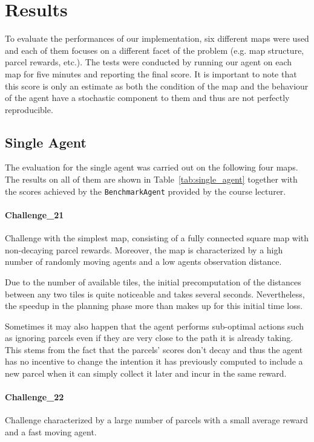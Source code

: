 \section{Results}
To evaluate the performances of our implementation, six different maps were used and each of them focuses on a different facet of the problem (e.g. map structure, parcel rewards, etc.). The tests were conducted by running our agent on each map for five minutes and reporting the final score. It is important to note that this score is only an estimate as both the condition of the map and the behaviour of the agent have a stochastic component to them and thus are not perfectly reproducible.

\subsection{Single Agent}
The evaluation for the single agent was carried out on the following four maps. The results on all of them are shown in Table~\ref{tab:single_agent} together with the scores achieved by the \texttt{BenchmarkAgent} provided by the course lecturer.

\paragraph{Challenge\_21} Challenge with the simplest map, consisting of a fully connected square map with non-decaying parcel rewards. Moreover, the map is characterized by a high number of randomly moving agents and a low agents observation distance.

Due to the number of available tiles, the initial precomputation of the distances between any two tiles is quite noticeable and takes several seconds. Nevertheless, the speedup in the planning phase more than makes up for this initial time loss.

Sometimes it may also happen that the agent performs sub-optimal actions such as ignoring parcels even if they are very close to the path it is already taking. This stems from the fact that the parcels' scores don't decay and thus the agent has no incentive to change the intention it has previously computed to include a new parcel when it can simply collect it later and incur in the same reward.
\paragraph{Challenge\_22} Challenge characterized by a large number of parcels with a small average reward and a fast moving agent.

